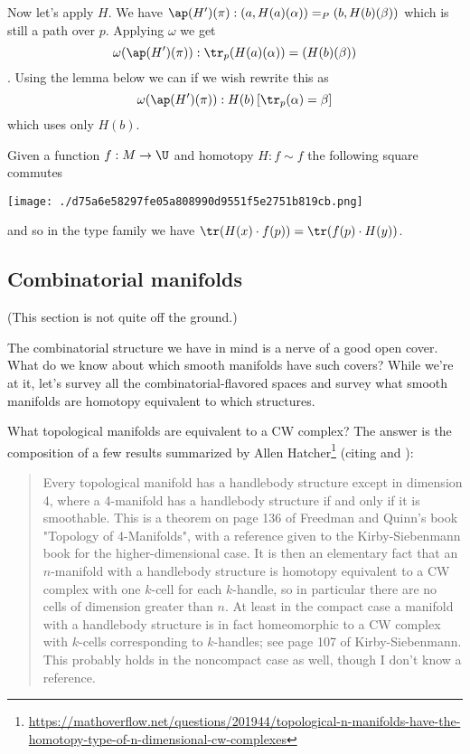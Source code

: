 Now let's apply \(H\). We have
\(\ap(H')(\pi):(a,H(a)(\alpha))=_P(b,H(b)(\beta))\) which is still a
path over \(p\). Applying \(\omega\) we get
\[\omega(\ap(H')(\pi)):\tr_p(H(a)(\alpha))=(H(b)(\beta))\]. Using the
lemma below we can if we wish rewrite this as
\[\omega(\ap(H')(\pi)):H(b)\left[\tr_p(\alpha)=\beta\right]\] which uses
only \(H(b)\).

Given a function \(f:M\to\U\) and homotopy \(H:f\sim f\) the following
square commutes

\texttt{[image: ./d75a6e58297fe05a808990d9551f5e2751b819cb.png]}

and so in the type family we have
\(\tr(H(x)\cdot f(p)) = \tr(f(p)\cdot H(y))\).

\subsection{Combinatorial manifolds}\label{combinatorial-manifolds}

(This section is not quite off the ground.)

The combinatorial structure we have in mind is a nerve of a good open
cover. What do we know about which smooth manifolds have such covers?
While we're at it, let's survey all the combinatorial-flavored spaces
and survey what smooth manifolds are homotopy equivalent to which
structures.

What topological manifolds are equivalent to a CW complex? The answer is
the composition of a few results summarized by Allen Hatcher\footnote{\url{https://mathoverflow.net/questions/201944/topological-n-manifolds-have-the-homotopy-type-of-n-dimensional-cw-complexes}}
(citing \cite{kirby_siebenmann} and \cite{freedman_quinn}):

\begin{quote}
Every topological manifold has a handlebody structure except in
dimension 4, where a 4-manifold has a handlebody structure if and only
if it is smoothable. This is a theorem on page 136 of Freedman and
Quinn's book "Topology of 4-Manifolds", with a reference given to the
Kirby-Siebenmann book for the higher-dimensional case. It is then an
elementary fact that an \(n\)-manifold with a handlebody structure is
homotopy equivalent to a CW complex with one \(k\)-cell for each
\(k\)-handle, so in particular there are no cells of dimension greater
than \(n\). At least in the compact case a manifold with a handlebody
structure is in fact homeomorphic to a CW complex with \(k\)-cells
corresponding to \(k\)-handles; see page 107 of Kirby-Siebenmann. This
probably holds in the noncompact case as well, though I don't know a
reference.
\end{quote}

